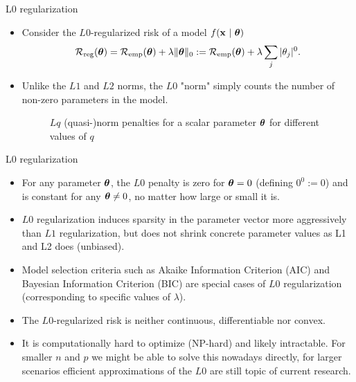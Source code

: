 \documentclass[11pt,compress,t,notes=noshow, xcolor=table]{beamer}
\begin{document}
\begin{vbframe}{L0 regularization}

  \begin{itemize}
    \item Consider the $L0$-regularized risk of a model $f(\mathbf{x} ~|~ \bm{\theta})$
  $$
  \mathcal{R}_{\text{reg}}(\bm{\theta}) = \mathcal{R}_{\text{emp}}(\bm{\theta}) + \lambda \|\bm{\theta}\|_0 := \mathcal{R}_{\text{emp}}(\bm{\theta}) + \lambda \sum_j |\theta_j|^0.
  $$
      \item Unlike the $L1$ and $L2$ norms, the $L0$ "norm" simply counts the number of non-zero parameters in the model.
      \vspace{0.3cm}
    \begin{figure}
      \centering
        \caption{\footnotesize $Lq$ (quasi-)norm penalties for a scalar parameter $\bm{\theta}$ for different values of $q$}
    \end{figure}

    \end{itemize}
    
\end{vbframe}

\begin{vbframe} {L0 regularization}

    \begin{itemize}
    \item For any parameter $\bm{\theta}$, the $L0$ penalty is zero for $\bm{\theta} = 0$ (defining $0^0 := 0$) and is constant for any $\bm{\theta} \neq 0$, no matter how large or small it is.
    \item $L0$ regularization induces sparsity in the parameter vector more aggressively than $L1$ regularization, but does not shrink concrete parameter values as L1 and L2 does (unbiased).
    \item Model selection criteria such as Akaike Information Criterion (AIC) and Bayesian Information Criterion (BIC) are special cases of $L0$ regularization (corresponding to specific values of $\lambda$).
    \item The $L0$-regularized risk is neither continuous, differentiable nor convex. 
    \item It is computationally hard to optimize (NP-hard) and likely intractable. 
      For smaller $n$ and $p$ we might be able to solve this nowadays directly, for larger scenarios efficient approximations of the $L0$ are still topic of current research.
  \end{itemize}
\end{vbframe}
\end{document}
